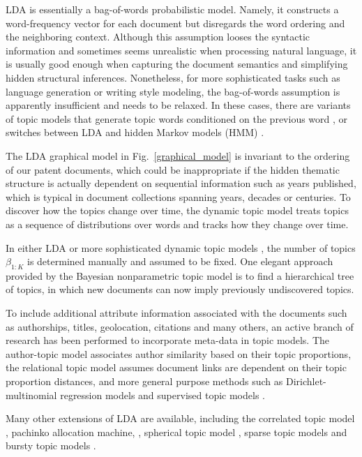 \documentclass[conference]{IEEEtran}
\begin{document}
LDA is essentially a bag-of-words probabilistic model. Namely, it constructs a word-frequency vector for each document but disregards the word ordering and the neighboring context. Although this assumption looses the syntactic information and sometimes seems unrealistic when processing natural language, it is usually good enough when capturing the document semantics and simplifying hidden structural inferences. Nonetheless, for more sophisticated tasks such as language generation or writing style modeling, the bag-of-words assumption is apparently insufficient and needs to be relaxed. In these cases, there are variants of topic models that generate topic words conditioned on the previous word \cite{wallach2006}, or switches between LDA and hidden Markov models (HMM) \cite{griffiths2005}.

The LDA graphical model in Fig.~\ref{graphical_model} is invariant to the ordering of our patent documents, which could be inappropriate if the hidden thematic structure is actually dependent on sequential information such as years published, which is typical in document collections spanning years, decades or centuries. To discover how the topics change over time, the dynamic topic model \cite{blei2006} treats topics as a sequence of distributions over words and tracks how they change over time.

In either LDA or more sophisticated dynamic topic models \cite{blei2006}, the number of topics $\beta_{1:K}$ is determined manually and assumed to be fixed. One elegant approach provided by the Bayesian nonparametric topic model \cite{teh2006} is to find a hierarchical tree of topics, in which new documents can now imply previously undiscovered topics.

To include additional attribute information associated with the documents such as authorships, titles, geolocation, citations and many others, an active branch of research has been performed to incorporate meta-data in topic models. The author-topic model \cite{rosen-zvi2004} associates author similarity based on their topic proportions, the relational topic model \cite{blei2010} assumes document links are dependent on their topic proportion distances, and more general purpose methods such as Dirichlet-multinomial regression models \cite{mimno2008} and supervised topic models \cite{blei2007}.

Many other extensions of LDA are available, including the correlated topic model \cite{blei2007a}, pachinko allocation machine,  \cite{li2006}, spherical topic model \cite{reisinger2010}, sparse topic models \cite{wang2009} and bursty topic models \cite{doyle2009}.
\end{document}
